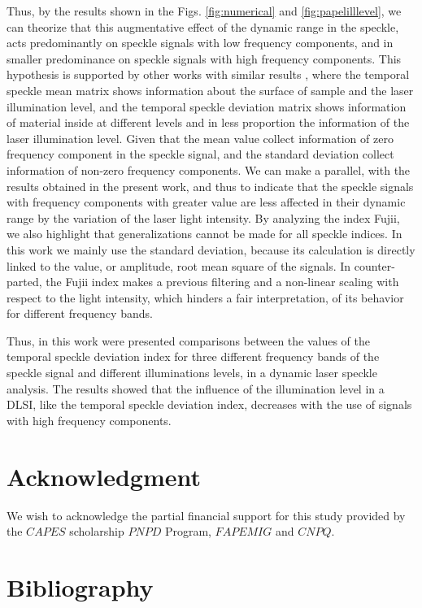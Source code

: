 \documentclass[review]{elsarticle}
\begin{document}
Thus, by the results shown in the Figs. \ref{fig:numerical} and \ref{fig:papelilllevel},
we can theorize that this augmentative effect of the dynamic range in the speckle, acts predominantly on speckle signals with low frequency components, and in smaller predominance on speckle signals with high frequency components. 
This hypothesis is supported by other works with similar results \cite{Nothdurft:05},
where the temporal speckle mean matrix shows information about the surface of sample and the laser illumination level, and the temporal speckle deviation matrix shows information of material inside at different levels and in less proportion the information of the laser illumination level.
Given that the mean value collect information of zero frequency component in the speckle signal, 
and the standard deviation  collect information of non-zero frequency components.
We can make a parallel, with the results obtained in the present work,
and thus  to indicate that the speckle signals with frequency components with greater value are less affected in their dynamic range by the variation of the laser light intensity.
By analyzing the index Fujii, we also highlight that generalizations cannot be made for all speckle indices.
In this work we mainly use the standard deviation, because its calculation is directly linked to the value, or amplitude, root mean square of the signals.
In counter-parted, the Fujii index makes a previous filtering and a non-linear scaling with respect to the light intensity, which hinders a fair interpretation, of its behavior for different frequency bands.


Thus, in this work were presented comparisons between the values of the temporal speckle deviation index for three different frequency bands of the speckle signal and different illuminations levels, 
in a dynamic laser speckle analysis. 
The results showed that the influence of the illumination level in a DLSI, 
like the temporal speckle deviation index, 
decreases with the use of signals with high frequency components.


\section{Acknowledgment}
We wish to acknowledge the partial financial support for this study provided by the $CAPES$ 
scholarship
$PNPD$ Program, $FAPEMIG$ and $CNPQ$.

\section{Bibliography}


\end{document}

